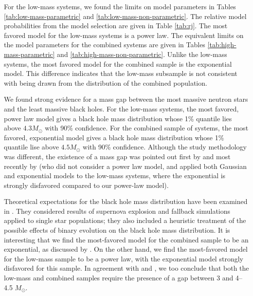 \documentclass[preprint]{aastex}
\newcommand{\Msun}{M_\odot}
\begin{document}
For the low-mass systems, we found the limits on model parameters in
Tables \ref{tab:low-mass-parametric} and
\ref{tab:low-mass-non-parametric}.  The relative model probabilities
from the model selection are given in Table \ref{tab:rj}.  The most
favored model for the low-mass systems is a power law.  The equivalent
limits on the model parameters for the combined systems are given in
Tables \ref{tab:high-mass-parametric} and
\ref{tab:high-mass-non-parametric}.  Unlike the low-mass systems, the
most favored model for the combined sample is the exponential model.
This difference indicates that the low-mass subsample is not
consistent with being drawn from the distribution of the combined
population.

We found strong evidence for a mass gap between the most massive
neutron stars and the least massive black holes.  For the low-mass
systems, the most favored, power law model gives a black hole mass
distribution whose 1\% quantile lies above $4.3 \Msun$ with 90\%
confidence.  For the combined sample of systems, the most favored,
exponential model gives a black hole mass distribution whose 1\%
quantile lise above $4.5 \Msun$ with 90\% confidence.  Although the
study methodology was different, the existence of a mass gap was
pointed out first by \citet{Bailyn1998} and most recently by
\citet{Ozel2010} (who did not consider a power law model, and applied
both Gaussian and exponential models to the low-mass systems, where
the exponential is strongly disfavored compared to our power-law
model).

Theoretical expectations for the black hole mass distribution have
been examined in \citet{Fryer2001}.  They considered results of
supernova explosion and fallback simulations \citep{Fryer1999} applied
to single star populations; they also included a heuristic treatment
of the possible effects of binary evolution on the black hole mass
distribution.  It is interesting that we find the most-favored model
for the combined sample to be an exponential, as discussed by
\citet{Fryer2001}.  On the other hand, we find the most-favored model
for the low-mass sample to be a power law, with the exponential model
strongly disfavored for this sample. In agreement with
\citet{Bailyn1998} and \citet{Ozel2010}, we too conclude that both the
low-mass and combined samples require the presence of a gap between 3
and 4--4.5 $\Msun$.
\end{document}
